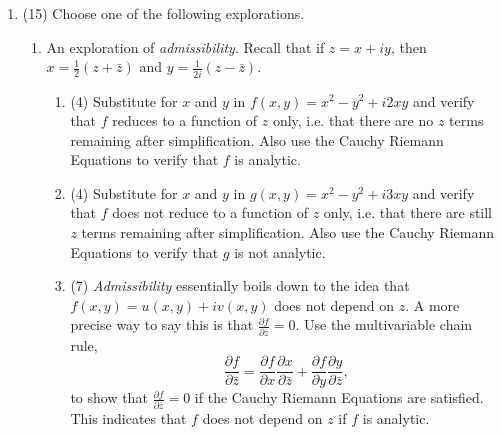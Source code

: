 \documentclass[11pt]{article}
\begin{document}
\begin{enumerate}
\begin{mdframed}
\end{mdframed}


\item (15) Choose one of the following explorations.
\begin{enumerate}
  \addtocounter{enumii}{1}
  \item  An exploration of {\it admissibility}. Recall that if $z = x + iy$, then $x = \frac{1}{2}(z + \bar{z})$ and $y = \frac{1}{2i}(z - \bar{z})$.
  
  \begin{enumerate}
  \item (4) Substitute for $x$ and $y$ in $f(x,y) = x^2 - y^2 + i2xy$ and verify that $f$ reduces to a function of $z$ only, i.e. that there are no $z$ terms remaining after simplification. Also use the Cauchy Riemann Equations to verify that $f$ is analytic.

  \begin{mdframed}
  
  \end{mdframed}

    
  \item (4) Substitute for $x$ and $y$ in $g(x,y) = x^2 - y^2 + i 3 x y$ and verify that $f$ does not reduce to a function of $z$ only, i.e. that there are still $z$ terms remaining after simplification. Also use the Cauchy Riemann Equations to verify that $g$ is not analytic.

  \begin{mdframed}
  
  \end{mdframed}

  \item (7) {\it Admissibility} essentially boils down to the idea that $f(x,y) = u(x, y) + iv(x, y)$ does not depend on $z$. A more precise way to say this is that $\frac{\partial f}{\partial \bar{z}} = 0$. Use the multivariable chain rule,
  \begin{equation*}
    \frac{\partial f}{\partial \bar{z}} = \frac{\partial f}{\partial x} \frac{\partial x}{\partial \bar{z}} + \frac{\partial f}{\partial y} \frac{\partial y}{\partial \bar{z}},
  \end{equation*}
  to show that $\frac{\partial f}{\partial \bar{z}} = 0$ if the Cauchy Riemann Equations are satisfied. This indicates that $f$ does not depend on $z$ if $f$ is analytic.

  \begin{mdframed}
  
  \end{mdframed}

  \end{enumerate}
\end{enumerate}

\end{enumerate}
\end{document}
